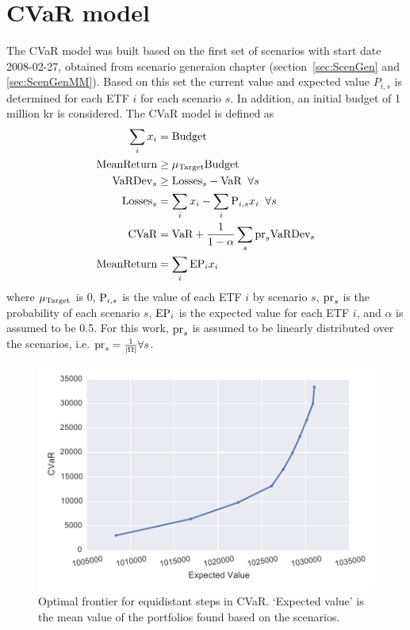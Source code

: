 \section{CVaR model}\label{sec:CVaR}

The CVaR model was built based on the first set of scenarios with start date 2008-02-27, obtained from scenario generaion chapter (section~\ref{sec:ScenGen} and \ref{sec:ScenGenMM}). 
Based on this set the current value and expected value $P_{i,s}$ is determined for each ETF $i$ for each scenario $s$.
In addition, an initial budget of 1 million kr is considered.  
The CVaR model is defined as
\begin{align}
\sum_{i} x_{i} &= \textup{Budget} \\
\textup{MeanReturn} &\ge \mu_{\textup{Target}} \textup{Budget} \\
\textup{VaRDev}_{s} &\ge \textup{Losses}_{s} - \textup{VaR} \; \; \forall s \label{eq:VarDev}\\
\textup{Losses}_{s} &= \sum_{i} x_{i} - \sum_{i} \textup{P}_{i,s} x_{i} \; \; \forall s \\
\textup{CVaR} &= \textup{VaR} + \frac{1} {1 - \alpha} \sum_{s} \textup{pr}_{s} \textup{VaRDev}_{s} \\
\textup{MeanReturn} &= \sum_{i} \textup{EP}_{i} x_{i} \label{eq:MeanReturn}
\end{align}
where $ \mu_{\textup{Target}}$ is 0, $\textup{P}_{i,s}$ is the value of each ETF $i$ by scenario $s$, $\textup{pr}_{s}$ is the probability of each scenario $s$, $\textup{EP}_{i}$ is the expected value for each ETF $i$, and $\alpha$ is assumed to be 0.5.
For this work, $\textup{pr}_{s}$ is assumed to be linearly distributed over the scenarios, i.e. $\textup{pr}_{s} = \frac{1}{|\Omega|} \forall s$.

\begin{figure}[tp]
\centering
\includegraphics[width=1.0\textwidth]{../pic/frontier.pdf}
\caption{Optimal frontier for equidistant steps in CVaR. `Expected value' is the mean value of the portfolios found based on the scenarios.}
\label{fig:frontier}
\end{figure}


